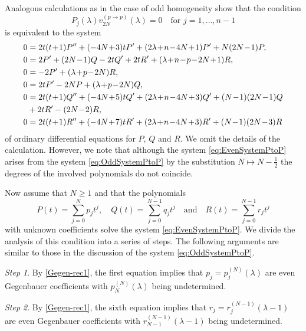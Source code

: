 \documentclass[a4paper,12pt,reqno]{amsart}
\numberwithin{theorem}{subsection}
\numberwithin{equation}{section}
\begin{document}
Analogous calculations as in the case of odd homogeneity show that the condition
\begin{equation*}
    P_j(\lambda) v^{(p\to p)}_{2N}(\lambda) = 0 \quad \mbox{for $j=1,\dots,n-1$}
\end{equation*}
is equivalent to the system
\begin{align}\label{eq:EvenSystemPtoP}
    0 & = 2t(t\!+\!1)P^{\prime\prime} + (-4N\!+\!3)t P^\prime + (2\lambda\!+\!n\!-\!4N\!+\!1) P^\prime
    + N(2N\!-\!1)P, \notag\\
    0 & = 2P^\prime + (2N\!-\!1)Q - 2tQ^\prime + 2tR^\prime + (\lambda\!+\!n\!-\!p\!-\!2N\!+\!1)R, \notag\\
    0 & = -2P^\prime + (\lambda\!+\!p\!-\!2N) R,\notag\\
    0 & = 2tP^\prime -2NP + (\lambda\!+\!p\!-\!2N) Q,\notag\\
    0 & = 2t(t\!+\!1)Q^{\prime\prime} + (-4N\!+\!5)t Q^\prime + (2\lambda\!+\!n\!-\!4N\!+\!3) Q^\prime
    + (N\!-\!1)(2N\!-\!1)Q \notag \\
    & + 2tR^\prime -(2N\!-\!2)R,\notag\\
    0 & = 2t(t\!+\!1)R^{\prime\prime} + (-4N\!+\!7)tR^\prime + (2\lambda\!+\!n\!-\!4N\!+\!3) R^\prime +
    (N\!-\!1)(2N\!-\!3)R
\end{align}
of ordinary differential equations for $P$, $Q$ and $R$. We omit the details of
the calculation. However, we note that although the system
\eqref{eq:EvenSystemPtoP} arises from the system \eqref{eq:OddSystemPtoP} by
the substitution $N \mapsto N-\tfrac{1}{2}$ the degrees of the involved
polynomials do not coincide.

Now assume that $N \ge 1$ and that the polynomials
$$
   P(t) = \sum_{j=0}^{N} p_j t^j, \quad Q(t) = \sum_{j=0}^{N-1} q_j t^j \quad
   \mbox{and} \quad R(t) = \sum_{j=0}^{N-1} r_j t^j
$$
with unknown coefficients solve the system \eqref{eq:EvenSystemPtoP}. We divide
the analysis of this condition into a series of steps. The following arguments
are similar to those in the discussion of the system \eqref{eq:OddSystemPtoP}.

{\em Step 1}. By \eqref{Gegen-rec1}, the first equation implies that $p_j =
p^{(N)}_j(\lambda)$  are even Gegenbauer coefficients with $p_N^{(N)}(\lambda)$
being undetermined.

{\em Step 2}. By \eqref{Gegen-rec1}, the sixth equation implies that
$r_j=r^{(N-1)}_j(\lambda-1)$ are even Gegenbauer coefficients with
$r_{N-1}^{(N-1)}(\lambda\!-\!1)$ being undetermined.
\end{document}
